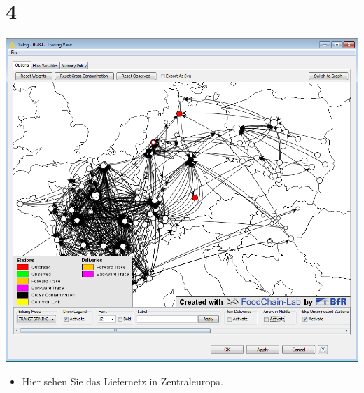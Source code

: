\documentclass{beamer}
\begin{document}
\section{4}
\begin{frame}
	\begin{center}
  		\includegraphics[height=0.6\textheight]{4.png}
	\end{center}
	\begin{itemize}
		\item Hier sehen Sie das Liefernetz in Zentraleuropa.
	\end{itemize}
\end{frame}
\end{document}
